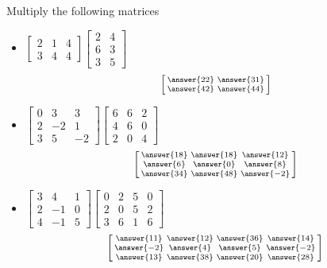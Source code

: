 \documentclass{ximera}
\begin{document}
\begin{exercise}%
    Multiply the following matrices
    \begin{itemize}
        \item
        $\begin{bmatrix}
            2 & 1 & 4 \\
            3 & 4 & 4
        \end{bmatrix}
        \begin{bmatrix}
            2 & 4 \\
            6 & 3 \\
            3 & 5
        \end{bmatrix}$
        \[
            \left[\begin{smallmatrix} \answer{22} & \answer{31} \\ \answer{42} & \answer{44} \end{smallmatrix}\right]
        \]
        \item
        $\begin{bmatrix}
            0 & 3 & 3 \\
            2 & -2 & 1 \\
            3 & 5 & -2
        \end{bmatrix}
        \begin{bmatrix}
            6 & 6 & 2 \\
            4 & 6 & 0 \\
            2 & 0 & 4
        \end{bmatrix}$
        \[
            \left[\begin{smallmatrix} \answer{18} & \answer{18} & \answer{12} \\ \answer{6} & \answer{0} & \answer{8} \\ \answer{34} & \answer{48} & \answer{-2} \end{smallmatrix}\right]
        \]
        \item
        $\begin{bmatrix}
            3 & 4 & 1 \\
            2 & -1 & 0 \\
            4 & -1 & 5
        \end{bmatrix}
        \begin{bmatrix}
            0 & 2 & 5 & 0 \\
            2 & 0 & 5 & 2 \\
            3 & 6 & 1 & 6
        \end{bmatrix}$
        \[
            \left[\begin{smallmatrix} \answer{11} & \answer{12} & \answer{36} & \answer{14} \\ \answer{-2} & \answer{4} & \answer{5} & \answer{-2} \\ \answer{13} & \answer{38} & \answer{20} & \answer{28} \end{smallmatrix}\right]
\]
\end{itemize}
\end{exercise}
\end{document}
